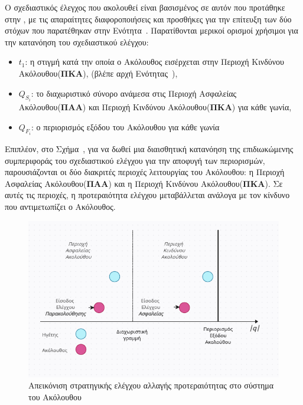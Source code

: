 \bigskip
Ο σχεδιαστικός έλεγχος που ακολουθεί είναι βασισμένος σε αυτόν που προτάθηκε στην \cite{BIKAS20239972}, με τις απαραίτητες διαφοροποιήσεις και προσθήκες για την επίτευξη των δύο στόχων που παρατέθηκαν στην Ενότητα~. Παρατίθονται μερικοί ορισμοί χρήσιμοι για την κατανόηση του σχεδιαστικού ελέγχου:
\begin{itemize}
  \item $t_1$: η στιγμή κατά την οποία ο Ακόλουθος εισέρχεται στην Περιοχή Κινδύνου Ακόλουθου(\textbf{ΠΚΑ}), (βλέπε αρχή Ενότητας~),
  \item $Q_{S_{i}}$: το διαχωριστικό σύνορο ανάμεσα στις Περιοχή Ασφαλείας Ακόλουθου(\textbf{ΠΑΑ}) και Περιοχή Κινδύνου Ακόλουθου(\textbf{ΠΚΑ}) για κάθε γωνία,
  \item $Q_{F_{i}}$: ο περιορισμός εξόδου του Ακόλουθου για κάθε γωνία
\end{itemize}

\bigskip
Επιπλέον, στο Σχήμα~, για να δωθεί μια διαισθητική κατανόηση της επιδιωκώμενης συμπεριφοράς του σχεδιαστικού ελέγχου για την αποφυγή των περιορισμών, παρουσιάζονται οι δύο διακριτές περιοχές λειτουργίας του Ακόλουθου: η Περιοχή Ασφαλείας Ακόλουθου(\textbf{ΠΑΑ}) και η Περιοχή Κινδύνου Ακόλουθου(\textbf{ΠΚΑ}). Σε αυτές τις περιοχές, η προτεραιότητα ελέγχου μεταβάλλεται ανάλογα με τον κίνδυνο που αντιμετωπίζει ο Ακόλουθος.

\begin{figure}[!ht]
  \begin{center}
    \includegraphics[width=1\linewidth]{Chapters/Chapter2/Figures/Control_Concept.png}
    \caption[Απεικόνιση στρατηγικής ελέγχου αλλαγής προτεραιότητας στο σύστημα του Ακόλουθου]{Απεικόνιση στρατηγικής ελέγχου αλλαγής προτεραιότητας στο σύστημα του Ακόλουθου}
    \label{control_concept}
  \end{center}
\end{figure}

